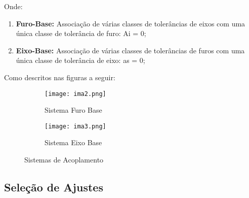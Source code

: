 \documentclass{article}
\begin{document}
            Onde:
                \begin{enumerate}[noitemsep]
                    \item \textbf{Furo-Base:} Associação de várias classes de tolerâncias de eixos com uma única classe de tolerância de furo: Ai = 0;
                    \item \textbf{Eixo-Base:} Associação de várias classes de tolerâncias de furos com uma única classe de tolerância de eixo: as = 0;
                \end{enumerate}
            Como descritos nas figuras a seguir:
                \begin{figure}[h]
                    \begin{subfigure}[t]{0.5\textwidth}
                        \centering
                        \texttt{[image: ima2.png]}
                        \caption{Sistema Furo Base}
                    \end{subfigure}
                    \begin{subfigure}[t]{0.5\textwidth}
                        \centering
                        \texttt{[image: ima3.png]}
                        \caption{Sistema Eixo Base}
                    \end{subfigure}
                    \caption{Sistemas de Acoplamento}
                \end{figure}

        \subsection{Seleção de Ajustes}
\end{document}
